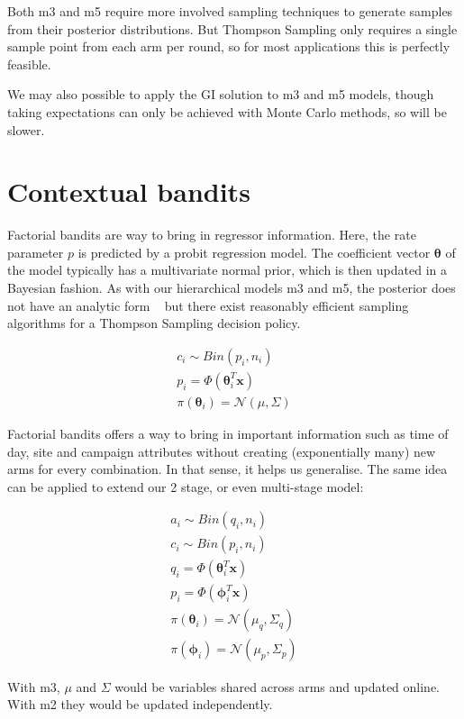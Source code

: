 \documentclass[11pt,a4,singlespacing,titlepagenumber=on]{scrreprt}
\numberwithin{equation}{chapter} %
\theoremstyle{remark}
\begin{document}
Both m3 and m5 require more involved sampling techniques to generate samples from their posterior distributions. But Thompson Sampling only requires a single sample point from each arm per round, so for most applications this is perfectly feasible.

We may also possible to apply the GI solution to m3 and m5 models, though taking expectations can only be achieved with Monte Carlo methods, so will be slower.

\section{Contextual bandits}

Factorial bandits are way to bring in regressor information. Here, the rate parameter $p$ is predicted by a probit regression model. The coefficient vector $\mathbf{\theta}$ of the model typically has a multivariate normal prior, which is then updated in a Bayesian fashion. As with our hierarchical models m3 and m5, the posterior does not have an analytic form ~\cite{scott2010modern} but there exist reasonably efficient sampling algorithms for a Thompson Sampling decision policy.

\begin{align}
	c_i \sim Bin(p_i,n_i) \\
	p_i = \Phi(\mathbf{\theta}_i^T \mathbf{x}) \\
	\pi(\mathbf{\theta}_i) = \mathcal{N}(\mu,\Sigma)
\end{align}

Factorial bandits offers a way to bring in important information such as time of day, site and campaign attributes without creating (exponentially many) new arms for every combination. In that sense, it helps us generalise. The same idea can be applied to extend our 2 stage, or even multi-stage model:

\begin{align}
	a_i \sim Bin(q_i,n_i) \\
	c_i \sim Bin(p_i,n_i) \\
	q_i = \Phi(\mathbf{\theta}_i^T \mathbf{x}) \\
	p_i = \Phi(\mathbf{\phi}_i^T \mathbf{x}) \\
	\pi(\mathbf{\theta}_i) = \mathcal{N}(\mu_q,\Sigma_q) \\
	\pi(\mathbf{\phi}_i) = \mathcal{N}(\mu_p,\Sigma_p) 
\end{align}

With m3, $\mu$ and $\Sigma$ would be variables shared across arms and updated online. With m2 they would be updated independently.
\end{document}
